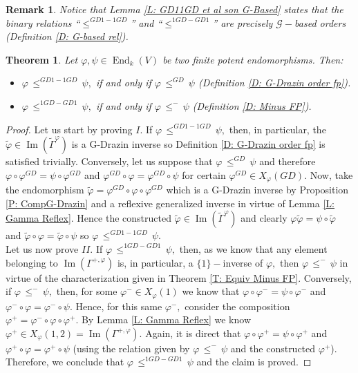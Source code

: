 \documentclass[10pt,a4paper]{amsart}
\newtheorem{thm}[defn]{Theorem}
\theoremstyle{plain}
\newtheorem{rem}[defn]{Remark}
\theoremstyle{remark}
\numberwithin{equation}{section} \numberwithin{defn}{section}
\newcommand\ed{\operatorname{End}}
\newcommand{\Img}{\operatorname{Im}}
\newcommand{\f}{\varphi}
\newcommand{\g}{\psi}
\begin{document}
\begin{rem}
Notice that Lemma \ref{L: GD11GD et al son G-Based} states that the binary relations ``$\leq^{GD1-1GD} $'' and ``$\leq^{1GD-GD1}$'' are precisely $\mathcal{G}-$based orders (Definition \ref{D: G-based rel}).
\end{rem}

\begin{thm}\label{T: Bilateral Relations are GDraz and Minus}
Let $\f , \g \in \ed_k(V)$ be two finite potent endomorphisms. Then: \begin{itemize}
\item[I.)] $\f \, \leq^{GD1-1GD} \, \g ,$ if and only if $\f \, \leq^{GD}\, \g$ (Definition \ref{D: G-Drazin order fp}).

\item[II.)] $\f \, \leq^{1GD-GD1} \, \g ,$ if and only if $\f \, \leq^- \, \g$ (Definition \ref{D: Minus FP}).
\end{itemize}
\end{thm}
\begin{proof}
Let us start by proving $I.$ If  $\f \, \leq^{GD1-1GD} \, \g ,$ then, in particular, the $\tilde{\f}\in \Img(\tilde{\Gamma}^{\f})$ is a G-Drazin inverse so Definition \ref{D: G-Drazin order fp} is satisfied trivially. Conversely, let us suppose that $\f \, \leq^{GD}\, \g$ and therefore $\f \circ \f^{GD}=\g \circ \f^{GD}$ and $\f^{GD}\circ \f=\f^{GD}\circ \g$ for certain $\f^{GD}\in X_{\f}(GD).$ Now, take the endomorphism $\tilde{\f}=\f^{GD}\circ \f \circ \f^{GD}$ which is a G-Drazin inverse by Proposition \ref{P: CompG-Drazin} and a reflexive generalized inverse in virtue of Lemma \ref{L: Gamma Reflex}. Hence the constructed $\tilde{\f}\in \Img(\tilde{\Gamma}^{\f})$ and clearly $\f \tilde{\f}=\g \circ \tilde{\f}$ and $\tilde{\f}\circ \f=\tilde{\f}\circ \g$ so $\f \, \leq^{GD1-1GD} \, \g .$\\Let us now prove $II.$ If $\f \, \leq^{1GD-GD1} \, \g ,$ then, as we know that any element belonging to $\Img(\Gamma^{+,\f})$ is, in particular, a $\{1\}-$inverse of $\f ,$ then $\f \, \leq^{-}\, \g$ in virtue of the characterization given in Theorem \ref{T: Equiv Minus FP}. Conversely, if $\f \, \leq^{-}\, \g ,$ then, for some $\f^-\in X_{\f}(1)$ we know that  $\f \circ \f^-=\g\circ \f^-$ and $\f^-\circ \f=\f^-\circ \g .$ Hence, for this same $\f^-,$ consider the composition $\f^+=\f^-\circ \f\circ \f^+.$ By Lemma \ref{L: Gamma Reflex} we know $\f^+ \in X_{\f}(1,2)=\Img(\Gamma^{+,\f}).$ Again, it is direct that $\f \circ \f^+=\g \circ \f^+$ and $\f^+\circ \f=\f^+\circ \g$ (using the relation given by $\f \, \leq^- \, \g$ and the constructed $\f^+$). Therefore, we conclude that $\f \, \leq^{1GD-GD1} \, \g $ and the claim is proved.
\end{proof}
\end{document}
